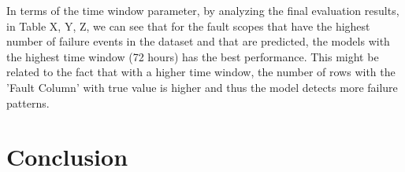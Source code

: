 In terms of the time window parameter, by analyzing the final evaluation results, in Table X, Y, Z, we can see that for the fault scopes that have the highest number of failure events in the dataset and that are predicted, the models with the highest time window (72 hours) has the best performance. This might be related to the fact that with a higher time window, the number of rows with the 'Fault Column' with true value is higher and thus the model detects more failure patterns.


\section{Conclusion} 
\label{sub:if_you_use_this_template}

